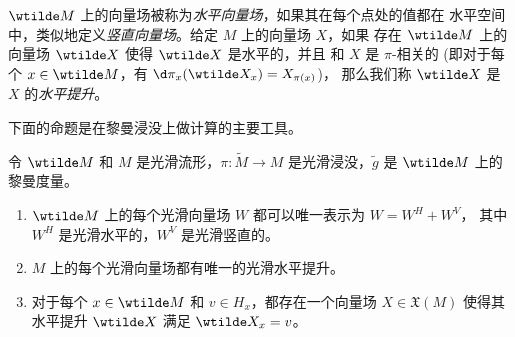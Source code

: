$\wtilde M$ 上的向量场被称为\emph{水平向量场}，如果其在每个点处的值都在
水平空间中，类似地定义\emph{竖直向量场}。给定 $M$ 上的向量场 $X$，如果
存在 $\wtilde M$ 上的向量场 $\wtilde X$ 使得 $\wtilde X$ 是水平的，并且
和 $X$ 是 $\pi$-相关的 (即对于每个 $x\in\wtilde M$，有 $\d\pi_x(\wtilde X_x)=X_{\pi(x)}$)，
那么我们称 $\wtilde X$ 是 $X$ 的\emph{水平提升}。

下面的命题是在黎曼浸没上做计算的主要工具。

\begin{proposition}[水平向量场的性质]
  令 $\wtilde M$ 和 $M$ 是光滑流形，$\pi:\tilde M\to M$ 是光滑浸没，$\tilde g$
  是 $\wtilde M$ 上的黎曼度量。
  \begin{enumerate}
    \item $\wtilde M$ 上的每个光滑向量场 $W$ 都可以唯一表示为 $W=W^H+W^V$，
    其中 $W^H$ 是光滑水平的，$W^V$ 是光滑竖直的。
    \item $M$ 上的每个光滑向量场都有唯一的光滑水平提升。
    \item 对于每个 $x\in \wtilde M$ 和 $v\in H_x$，都存在一个向量场 $X\in \mathfrak X(M)$
    使得其水平提升 $\wtilde X$ 满足 $\wtilde X_x=v$。
  \end{enumerate}
\end{proposition}
